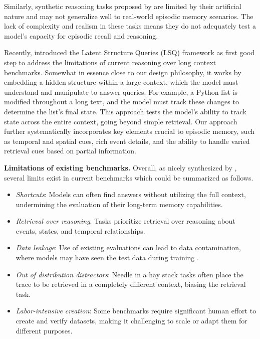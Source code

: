 \documentclass{article}
\begin{document}
Similarly, synthetic reasoning tasks proposed by \citet{Li2024} are limited by their artificial nature and may not generalize well to real-world episodic memory scenarios. The lack of complexity and realism in these tasks means they do not adequately test a model's capacity for episodic recall and reasoning.

Recently, \citet{vodrahalli2024michelangelo} introduced the Latent Structure Queries (LSQ) framework as first good step to address the limitations of current reasoning over long context benchmarks. 
Somewhat in essence close to our design philosophy, it works by embedding a hidden structure within a large context, which the model must understand and manipulate to answer queries. For example, a Python list is modified throughout a long text, and the model must track these changes to determine the list's final state. This approach tests the model's ability to track state across the entire context, going beyond simple retrieval.  
Our approach further systematically incorporates key elements crucial to episodic memory, such as temporal and spatial cues, rich event details, and the ability to handle varied retrieval cues based on partial information.

\noindent \textbf{Limitations of existing benchmarks.}
Overall, as nicely synthesized by \citet{vodrahalli2024michelangelo}, several limits exist in current benchmarks which could be summarized as follows.

\begin{itemize}
    \item \emph{Shortcuts}: Models can often find answers without utilizing the full context, undermining the evaluation of their long-term memory capabilities.
    \item \emph{Retrieval over reasoning}: Tasks prioritize retrieval over reasoning about events, states, and temporal relationships.
    \item \emph{Data leakage}: Use of existing evaluations can lead to data contamination, where models may have seen the test data during training \citep{Zhang2024Bench, agarwal2024many, bohnet2024long, Hsieh2024, Li2024}.
    \item \emph{Out of distribution distractors}: Needle in a hay stack tasks often place the trace to be retrieved in a completely different context, biasing the retrieval task. 
    \item \emph{Labor-intensive creation}: Some benchmarks require significant human effort to create and verify datasets, making it challenging to scale or adapt them for different purposes.
\end{itemize}
\end{document}
